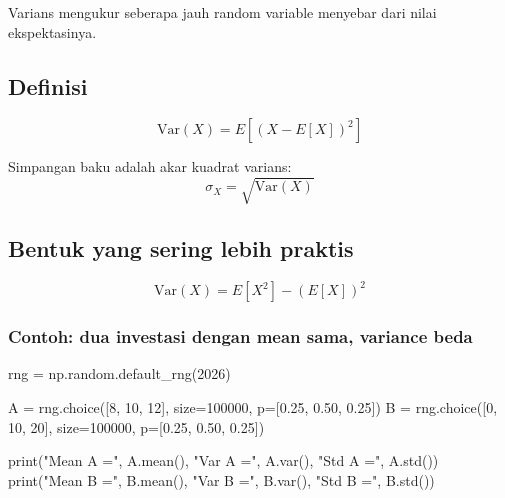 \documentclass[
  letterpaper,
  DIV=11,
  numbers=noendperiod]{scrreprt}
\newenvironment{Shaded}{\begin{snugshade}}{\end{snugshade}}
\newcommand{\BuiltInTok}[1]{\textcolor[rgb]{0.00,0.23,0.31}{#1}}
\newcommand{\DecValTok}[1]{\textcolor[rgb]{0.68,0.00,0.00}{#1}}
\newcommand{\FloatTok}[1]{\textcolor[rgb]{0.68,0.00,0.00}{#1}}
\newcommand{\NormalTok}[1]{\textcolor[rgb]{0.00,0.23,0.31}{#1}}
\newcommand{\OperatorTok}[1]{\textcolor[rgb]{0.37,0.37,0.37}{#1}}
\newcommand{\StringTok}[1]{\textcolor[rgb]{0.13,0.47,0.30}{#1}}
\begin{document}
Varians mengukur seberapa jauh random variable menyebar dari nilai
ekspektasinya.

\subsection{Definisi}\label{definisi}

\[
\mathrm{Var}(X)=E[(X-E[X])^2]
\]

Simpangan baku adalah akar kuadrat varians: \[
\sigma_X = \sqrt{\mathrm{Var}(X)}
\]

\subsection{Bentuk yang sering lebih
praktis}\label{bentuk-yang-sering-lebih-praktis}

\[
\mathrm{Var}(X)=E[X^2] - (E[X])^2
\]

\subsubsection{Contoh: dua investasi dengan mean sama, variance
beda}\label{contoh-dua-investasi-dengan-mean-sama-variance-beda}

\begin{Shaded}
\begin{Highlighting}[]
\NormalTok{rng }\OperatorTok{=}\NormalTok{ np.random.default\_rng(}\DecValTok{2026}\NormalTok{)}

\NormalTok{A }\OperatorTok{=}\NormalTok{ rng.choice([}\DecValTok{8}\NormalTok{, }\DecValTok{10}\NormalTok{, }\DecValTok{12}\NormalTok{], size}\OperatorTok{=}\DecValTok{100000}\NormalTok{, p}\OperatorTok{=}\NormalTok{[}\FloatTok{0.25}\NormalTok{, }\FloatTok{0.50}\NormalTok{, }\FloatTok{0.25}\NormalTok{])}
\NormalTok{B }\OperatorTok{=}\NormalTok{ rng.choice([}\DecValTok{0}\NormalTok{, }\DecValTok{10}\NormalTok{, }\DecValTok{20}\NormalTok{], size}\OperatorTok{=}\DecValTok{100000}\NormalTok{, p}\OperatorTok{=}\NormalTok{[}\FloatTok{0.25}\NormalTok{, }\FloatTok{0.50}\NormalTok{, }\FloatTok{0.25}\NormalTok{])}

\BuiltInTok{print}\NormalTok{(}\StringTok{"Mean A ="}\NormalTok{, A.mean(), }\StringTok{"Var A ="}\NormalTok{, A.var(), }\StringTok{"Std A ="}\NormalTok{, A.std())}
\BuiltInTok{print}\NormalTok{(}\StringTok{"Mean B ="}\NormalTok{, B.mean(), }\StringTok{"Var B ="}\NormalTok{, B.var(), }\StringTok{"Std B ="}\NormalTok{, B.std())}
\end{Highlighting}
\end{Shaded}
\end{document}
